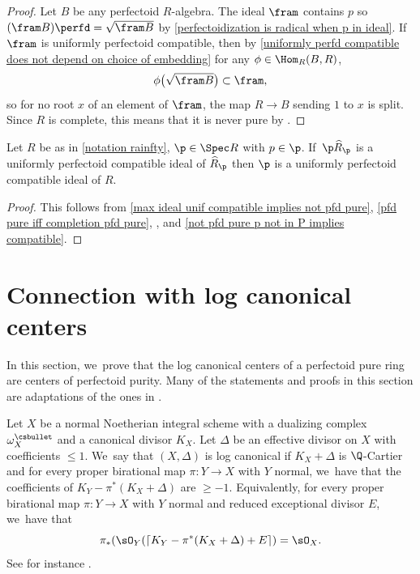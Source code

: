 \begin{proof}
Let $B$ be any perfectoid $R$\nobreakdash-algebra.
The ideal $\fram$ contains $p$ so $(\fram B)\perfd=\sqrt{\fram B}$ by \autoref{perfectoidization is radical when p in ideal}. If~$\fram$ is uniformly perfectoid compatible, then by \autoref{uniformly perfd compatible does not depend on choice of embedding} for any $\phi\in \Hom_R(B,R)$,
\[
\phi\bigl(\sqrt{\fram B}\bigr)\subset \fram,
\]
so for no root $x$ of an element of $\fram$, the map $R\to B$ sending $1$ to $x$ is split. Since $R$ is complete, this means that it is never pure by \cite[Lem.\,1.2]{FedderFPureRat}.
\end{proof}

\begin{corollary}\label{loc is uniformly compatible then ideal is uniformly compatible}
Let $R$ be as in \autoref{notation rainfty}, $\p\in \Spec R$ with $p\in \p$. If~$\p \widehat{R}_\p$ is a uniformly perfectoid compatible ideal of $\widehat{R}_\p$ then $\p$ is a uniformly perfectoid compatible ideal of $R$.
\end{corollary}

\begin{proof}
This follows from \autoref{max ideal unif compatible implies not pfd pure}, \autoref{pfd pure iff completion pfd pure}, \cite[Ex.\,3.8\,(7)]{BhattIyengarMaRegularRings},
and \autoref{not pfd pure p not in P implies compatible}.
\end{proof}

\section{Connection with log canonical centers}

In this section, we~prove that the log canonical centers of a perfectoid pure ring are centers of perfectoid purity. Many of the statements and proofs in this section are adaptations of the ones in \cite{BMPSTWWPerfectoidPure}.

\begin{definition}
Let $X$ be a normal Noetherian integral scheme with a dualizing complex $\omega^\csbullet_X$ and a canonical divisor $K_X$. Let $\Delta$ be an effective divisor on $X$ with coefficients $\leq 1$. We~say that $(X,\Delta)$ is log canonical if $K_X+\Delta$ is $\Q$-Cartier and for every proper birational map $\pi\colon Y\to X$ with $Y$ normal, we~have that the coefficients of $K_Y-\pi^*(K_X+\Delta)$ are $\geq -1$. Equivalently, for every proper birational map $\pi\colon Y\to X$ with $Y$ normal and reduced exceptional divisor $E$, we~have that
\begin{equation}\label{def lc}
\pi_*(\sO_Y(\lceil K_Y - \pi^*(K_X+\Delta) + E\rceil)=\sO_X.
\end{equation}
See for instance \cite[Cor.\,2.31]{KollarMori}.
\end{definition}

